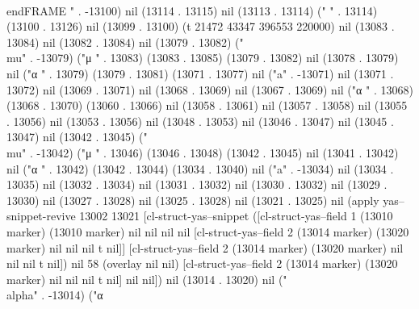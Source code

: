 \\end{FRAME}
" . -13100) nil (13114 . 13115) nil (13113 . 13114) (" " . 13114) (13100 . 13126) nil (13099 . 13100) (t 21472 43347 396553 220000) nil (13083 . 13084) nil (13082 . 13084) nil (13079 . 13082) ("\\mu" . -13079) ("μ
" . 13083) (13083 . 13085) (13079 . 13082) nil (13078 . 13079) nil ("α
" . 13079) (13079 . 13081) (13071 . 13077) nil ("a" . -13071) nil (13071 . 13072) nil (13069 . 13071) nil (13068 . 13069) nil (13067 . 13069) nil ("α
" . 13068) (13068 . 13070) (13060 . 13066) nil (13058 . 13061) nil (13057 . 13058) nil (13055 . 13056) nil (13053 . 13056) nil (13048 . 13053) nil (13046 . 13047) nil (13045 . 13047) nil (13042 . 13045) ("\\mu" . -13042) ("μ
" . 13046) (13046 . 13048) (13042 . 13045) nil (13041 . 13042) nil ("α
" . 13042) (13042 . 13044) (13034 . 13040) nil ("a" . -13034) nil (13034 . 13035) nil (13032 . 13034) nil (13031 . 13032) nil (13030 . 13032) nil (13029 . 13030) nil (13027 . 13028) nil (13025 . 13028) nil (13021 . 13025) nil (apply yas--snippet-revive 13002 13021 [cl-struct-yas--snippet ([cl-struct-yas--field 1 (13010 marker) (13010 marker) nil nil nil nil [cl-struct-yas--field 2 (13014 marker) (13020 marker) nil nil nil t nil]] [cl-struct-yas--field 2 (13014 marker) (13020 marker) nil nil nil t nil]) nil 58 (overlay nil nil) [cl-struct-yas--field 2 (13014 marker) (13020 marker) nil nil nil t nil] nil nil]) nil (13014 . 13020) nil ("\\alpha" . -13014) ("α
